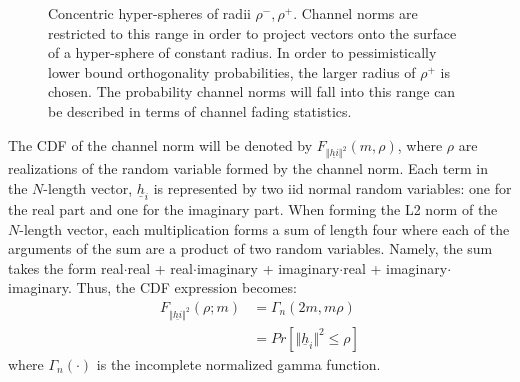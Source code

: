 \begin{figure}
    \centering
      \caption{Concentric hyper-spheres of radii $\rho^-,\rho^+$. Channel norms are restricted to this range in order to project vectors onto the surface of a hyper-sphere of constant radius. In order to pessimistically lower bound orthogonality probabilities, the larger radius of $\rho^+$ is chosen. The probability channel norms will fall into this range can be described in terms of channel fading statistics.}
    \label{fig:concentric_sphere}
\end{figure}
  



The CDF of the channel norm will be denoted by $F_{\Vert\underline{hi}\Vert^2}(m,\rho)$, where $\rho$ are realizations of the random variable formed by the channel norm. Each term in the $N$-length vector, $\underline{h}_i$ is represented by two iid normal random variables: one for the real part and one for the imaginary part. When forming the L2 norm of the $N$-length vector, each multiplication forms a sum of length four where each of the arguments of the sum are a product of two random variables. Namely, the sum takes the form real$\cdot$real + real$\cdot$imaginary + imaginary$\cdot$real + imaginary$\cdot$imaginary. Thus, the CDF expression becomes:
\begin{equation}\label{eq:ch_sq_cdf_chan}
    \begin{aligned}
        F_{\Vert\underline{hi}\Vert^2}(\rho;m)& = \Gamma_n(2m,m\rho)\\
        &= Pr[\Vert\underline{h}_i\Vert^2 \leq \rho]
    \end{aligned}
\end{equation}
where $\Gamma_n(\cdot)$ is the incomplete normalized gamma function.

